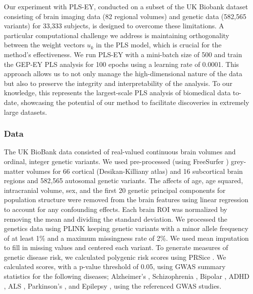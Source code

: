 Our experiment with PLS-EY, conducted on a subset of the UK Biobank dataset consisting of brain imaging data (82 regional volumes) and genetic data (582,565 variants) for 33,333 subjects, is designed to overcome these limitations.
A particular computational challenge we address is maintaining orthogonality between the weight vectors \( u_k \) in the PLS model, which is crucial for the method's effectiveness.
We run PLS-EY with a mini-batch size of 500 and train the GEP-EY PLS analysis for 100 epochs using a learning rate of 0.0001.
This approach allows us to not only manage the high-dimensional nature of the data but also to preserve the integrity and interpretability of the analysis.
To our knowledge, this represents the largest-scale PLS analysis of biomedical data to-date, showcasing the potential of our method to facilitate discoveries in extremely large datasets.

\subsubsection{Data} The UK BioBank data consisted of real-valued continuous brain volumes and ordinal, integer genetic variants.
We used pre-processed (using FreeSurfer \citep{Fischl2012}) grey-matter volumes for 66 cortical (Desikan-Killiany atlas) and 16 subcortical brain regions and 582,565 autosomal genetic variants.
The affects of age, age squared, intracranial volume, sex, and the first 20 genetic principal components for population structure were removed from the brain features using linear regression to account for any confounding effects.
Each brain ROI was normalized by removing the mean and dividing the standard deviation.
We processed the genetics data using PLINK \citep{Purcell2007} keeping genetic variants with a minor allele frequency of at least 1\%  and a maximum missingness rate of 2\%.
We used mean imputation to fill in missing values and centered each variant.
To generate measures of genetic disease risk, we calculated polygenic risk scores using PRSice \citep{PRSice2014}.
We calculated scores, with a p-value threshold of 0.05, using GWAS summary statistics for the following diseases; Alzheimer's \citep{Lambert2013}, Schizophrenia \citep{Trubetskoy2022}, Bipolar \citep{Mullins2021}, ADHD \citep{Demontis2023}, ALS \citep{Van_Rheenen2021}, Parkinson's \citep{Nalls2019}, and Epilepsy \citep{International_League_Against_Epilepsy_Consortium_on_Complex_Epilepsies2018}, using the referenced GWAS studies.

